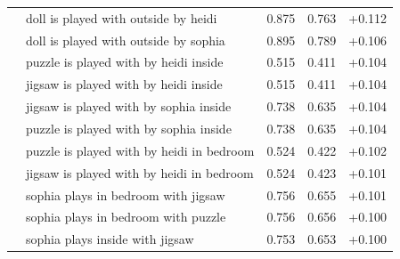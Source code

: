 \begin{longtable}{@{}llrrr@{}}
 & doll is played with outside by heidi & 0.875 & 0.763 & +0.112 \\
 & doll is played with outside by sophia & 0.895 & 0.789 & +0.106 \\
 & puzzle is played with by heidi inside & 0.515 & 0.411 & +0.104 \\
 & jigsaw is played with by heidi inside & 0.515 & 0.411 & +0.104 \\
 & jigsaw is played with by sophia inside & 0.738 & 0.635 & +0.104 \\
 & puzzle is played with by sophia inside & 0.738 & 0.635 & +0.104 \\
 & puzzle is played with by heidi in bedroom & 0.524 & 0.422 & +0.102 \\
 & jigsaw is played with by heidi in bedroom & 0.524 & 0.423 & +0.101 \\
 & sophia plays in bedroom with jigsaw & 0.756 & 0.655 & +0.101 \\
 & sophia plays in bedroom with puzzle & 0.756 & 0.656 & +0.100 \\
 & sophia plays inside with jigsaw & 0.753 & 0.653 & +0.100 \\
\end{longtable}
\normalsize
